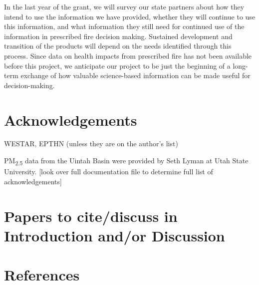\documentclass[authoryear]{elsarticle}
\begin{document}
In the last year of the grant, we will survey our state partners about how they intend to use the information we have provided, whether they will continue to use this information, and what information they still need for continued use of the information in prescribed fire decision making. Sustained development and transition of the products will depend on the needs identified through this process. Since data on health impacts from prescribed fire has not been available before this project, we anticipate our project to be just the beginning of a long-term exchange of how valuable science-based information can be made useful for decision-making. 

\section{Acknowledgements}

WESTAR, EPTHN (unless they are on the author's list)

PM\textsubscript{2.5} data from the Uintah Basin were provided by Seth Lyman at Utah State University. [look over full documentation file to determine full list of acknowledgements]




\section{Papers to cite/discuss in Introduction and/or Discussion}

\cite{westerling_increasing_2016,WesterlingCorrection2016}

\section*{References}

%

\end{document}
